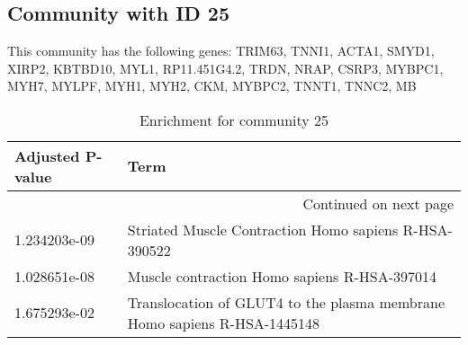 \subsection*{Community with ID 25}
This community has the following genes: TRIM63, TNNI1, ACTA1, SMYD1, XIRP2, KBTBD10, MYL1, RP11.451G4.2, TRDN, NRAP, CSRP3, MYBPC1, MYH7, MYLPF, MYH1, MYH2, CKM, MYBPC2, TNNT1, TNNC2, MB
\\
\begin{longtable}{p{2.4cm}p{14.5cm}}
\caption{Enrichment for community 25}\\
\toprule
Adjusted \newline P-value &                                                                      Term \\
\midrule
\endhead
\midrule
\multicolumn{2}{r}{{Continued on next page}} \\
\midrule
\endfoot

\bottomrule
\endlastfoot
             1.234203e-09 &                     Striated Muscle Contraction Homo sapiens R-HSA-390522 \\
             1.028651e-08 &                              Muscle contraction Homo sapiens R-HSA-397014 \\
             1.675293e-02 &  Translocation of GLUT4 to the plasma membrane Homo sapiens R-HSA-1445148 \\
\end{longtable}


